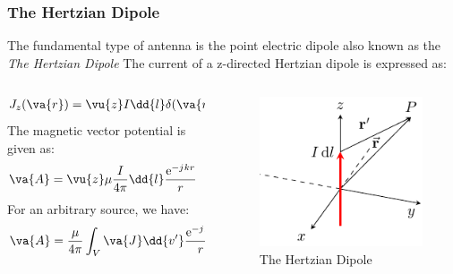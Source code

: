 \documentclass[10pt, compress]{beamer}
\renewcommand{\u}{\mu}  %
\newcommand{\e}{\mathrm{e}} %
\renewcommand{\j}{{j}\mkern1mu} %
\begin{document}
\begin{frame}
  \frametitle{The Hertzian Dipole}
  \begin{outline}
    \1 The fundamental type of antenna is the point electric dipole also known as the \textit{The Hertzian Dipole}
    \1 The current of a z-directed Hertzian dipole is expressed as:
  \end{outline}
  \begin{columns}[T] %
    \begin{column}{.65\textwidth}
      \begin{align*}
        J_z (\va{r}) & = \vu{z} I  \dd{l} \delta(\va{r})
      \end{align*}
      The magnetic vector potential is given as:
      \begin{align*}
        \va{A} & = \vu{z} \u \frac{I}{4 \pi} \dd{l} \frac{\e^{-\j k r}}{r}
      \end{align*}
      For an arbitrary source, we have:
      \begin{align*}
        \va{A} & =   \frac{\u}{4 \pi} \int_{V} \va{J} \dd{v'} \frac{\e^{-\j k r}}{r}
      \end{align*}
    \end{column}
    \begin{column}[T]{.35\textwidth}
      \begin{figure}
        \centering
        \includegraphics[width=.9\textwidth]{VED_above_half_space.pdf}
        \caption{The Hertzian Dipole}
      \end{figure}
    \end{column}%
  \end{columns}
\end{frame}
\end{document}
